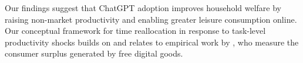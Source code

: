 \documentclass[12pt]{article}
\begin{document}
Our findings suggest that ChatGPT adoption improves household welfare by raising non-market productivity and enabling greater leisure consumption online. Our conceptual framework for time reallocation in response to task-level productivity shocks builds on \cite{aguiar2021} and relates to empirical work by \cite{brynjolfsson2025gdp}, who measure the consumer surplus generated by free digital goods.




\end{document}
